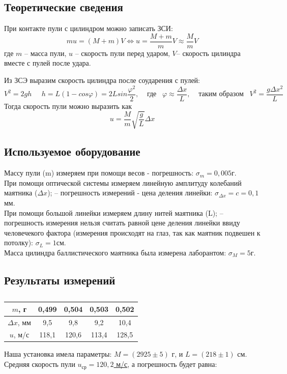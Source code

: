 \documentclass[a4paper,14pt]{extarticle}
\begin{document}
	\subsection{Теоретические сведения}
	\begin{center}
		При контакте пули с цилиндром можно записать ЗСИ:
		\begin{equation}
			mu = (M+m)V \Leftrightarrow u=\frac{M+m}{m}V \approx \frac{M}{m}V 
		\end{equation}
		где $m$ -- масса пули, $u$ -- скорость пули перед ударом, $V$-- скорость цилиндра вместе с пулей после удара.
 	\end{center}
    Из ЗСЭ выразим скорость цилиндра после соударения с пулей:
	\begin{equation}
		 V^2=2gh \;\;\;\;\; h = L(1-cos \varphi ) = 2L sin \frac{\varphi^2}{2}, \;\;\;\;\text{где}\;\;\; \varphi \approx \frac{\Delta x}{L},\;\;\;\; \text{таким образом}\;\;\; V^2=\frac{g\Delta x^2}{L}
	\end{equation}
	Тогда скорость пули можно выразить как
	\begin{equation} \label{vel1}
		u=\frac{M}{m} \sqrt{\frac{g}{L}} \Delta x
	\end{equation}
	\subsection{Используемое оборудование}
	Массу пули (m) измеряем при помощи весов - погрешность: $\sigma_m = 0,005$г.
	\\При помощи оптической системы измеряем линейную амплитуду колебаний маятника ($\Delta x$); -- погрешность измерений - цена деления линейки: $\sigma_{\Delta x} = c = 0,1$мм.
	\\При помощи большой линейки измеряем длину нитей маятника (L); -- погрешность измерения нельзя считать равной цене деления линейки ввиду человечекого фактора (измерения происходят на глаз, так как маятник подвешен к потолку): $\sigma_L = 1$см.
	\\Масса цилиндра баллистического маятника была измерена лаборантом: $\sigma_M = 5$г.
	\subsection{Результаты измерений} 	
	\begin{table}[H]
		\begin{center}
			\begin{tabular}[H]{|c|c|c|c|c|}
				\hline
				$m$, г & 0,499 & 0,504 & 0,503 & 0,502\\ \hline
				$\Delta x$, мм & 9,5 & 9,8 & 9,2 & 10,4\\ \hline
				$u$, м/с & 118,1 & 120,6 & 113,4 & 128,5 \\ \hline
			\end{tabular}
			\caption{}
		\end{center}
	\end{table}
	Наша установка имела параметры: $M = (2925 \pm 5)$ г, и $L = (218 \pm 1)$ см.
	Средняя скорость пули \underline{$u_\text{ср} = 120,2$ м/с}, а погрешность будет равна:
	
\end{document}

